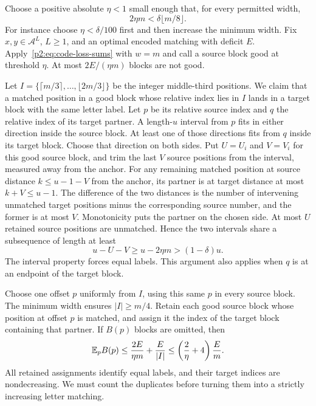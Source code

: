 Choose a positive absolute $\eta<1$ small enough that, for every permitted
width,
\begin{equation}\label{p2:eq:code-offset-parameters}
 2\eta m<\delta\lfloor m/8\rfloor.
\end{equation}
For instance choose $\eta<\delta/100$ first and then increase the minimum
width. Fix $x,y\in\mathcal A^L$, $L\geq1$, and an optimal encoded matching
with deficit $E$. Apply~\eqref{p2:eq:code-loss-sums} with $w=m$ and call a
source block good at threshold $\eta$. At most $2E/(\eta m)$ blocks are
not good.

Let $I=\{\lceil m/3\rceil,\ldots,\lfloor2m/3\rfloor\}$ be the integer
middle-third positions. We claim that a matched position in a good block whose relative index lies in $I$ lands
in a target block with the same letter label. Let $p$ be its relative source
index and $q$ the relative index of its target partner. A length-$u$
interval from $p$ fits in either direction inside the source block. At
least one of those directions fits from $q$ inside its target block. Choose
that direction on both sides. Put $U=U_i$ and $V=V_i$ for this good source
block, and trim the last $V$ source positions from the interval, measured
away from the anchor. For any remaining matched position at source distance
$k\leq u-1-V$ from the anchor, its partner is at target distance at most
$k+V\leq u-1$. The difference of the two distances is the number of
intervening unmatched target positions minus the corresponding source
number, and the former is at most $V$. Monotonicity puts the partner on the
chosen side. At most $U$ retained source positions are unmatched. Hence the
two intervals share a subsequence of length at least
\[
 u-U-V\geq u-2\eta m>(1-\delta)u.
\]
The interval property forces equal labels. This argument also applies when
$q$ is at an endpoint of the target block.

Choose one offset $p$ uniformly from $I$, using this same $p$ in every source
block. The minimum width ensures
$|I|\geq m/4$. Retain each good source block whose position at offset $p$
is matched, and assign it the index of the target block containing that
partner. If $B(p)$ blocks are omitted, then
\begin{equation}\label{p2:eq:code-offset-omissions}
 \mathbb E_pB(p)\leq\frac{2E}{\eta m}+\frac E{|I|}
       \leq\left(\frac2\eta+4\right)\frac Em.
\end{equation}
All retained assignments identify equal labels, and their target indices
are nondecreasing. We must count the duplicates before turning them into a
strictly increasing letter matching.

